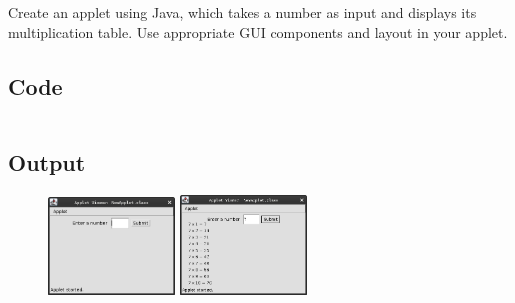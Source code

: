 \documentclass[../main.tex]{subfiles}
\begin{document}
Create an applet using Java, which takes a number as input and displays its
multiplication table. Use appropriate GUI components and layout in your applet.

\subsection{Code}
\inputminted[frame=lines, breaklines, breakanywhere, numberblanklines=false]{java}{./programs/prog14/Tables.java}

\subsection{Output}
\begin{figure}[h!]
	\centering
	\includegraphics[width=0.3\textwidth]{./assets/p14-s1.png}
	\includegraphics[width=0.3\textwidth]{./assets/p14-s2.png}
\end{figure}
\end{document}
